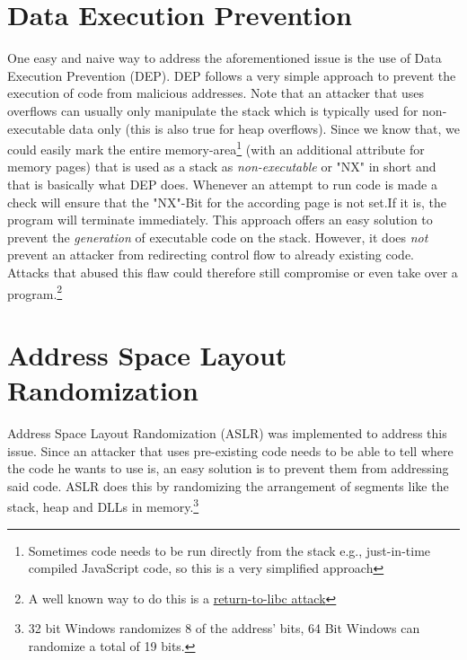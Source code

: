 \documentclass[10pt,twocolumn,a4paper]{article}
\begin{document}
\section{Data Execution Prevention}\label{sec:DEP}
One easy and naive way to address the aforementioned issue is the use of Data Execution Prevention (DEP).
DEP follows a very simple approach to prevent the execution of code from malicious addresses.
Note that an attacker that uses overflows can usually only manipulate the stack which is typically used for non-executable data only (this is also true for heap overflows).
Since we know that, we could easily mark the entire memory-area\footnote{Sometimes code needs to be run directly from the stack e.g., just-in-time compiled JavaScript code, so this is a very simplified approach} (with an additional attribute for memory pages) that is used as a stack as \emph{non-executable} or "NX" in short and that is basically what DEP does.
Whenever an attempt to run code is made a check will ensure that the "NX"-Bit for the according page is not set.If it is, the program will terminate immediately.
This approach offers an easy solution to prevent the \emph{generation} of executable code on the stack. However,	 it does \emph{not} prevent an attacker from redirecting control flow to already existing code. Attacks that abused this flaw could therefore still compromise or even take over a program.\footnote{A well known way to do this is a \hyperref{https://en.wikipedia.org/wiki/Return-to-libc_attack}{Return-to-Libc Exploits}{name}{return-to-libc attack}}

\section{Address Space Layout Randomization}\label{sec:ASLR}
Address Space Layout Randomization (ASLR) was implemented to address this issue.
Since an attacker that uses pre-existing code needs to be able to tell where the code he wants to use is, an easy solution is to prevent them from addressing said code.
ASLR does this by randomizing the arrangement of segments like the stack, heap and DLLs in memory.\footnote{32 bit Windows randomizes 8 of the address' bits, 64 Bit Windows can randomize a total of 19 bits.}
\end{document}
